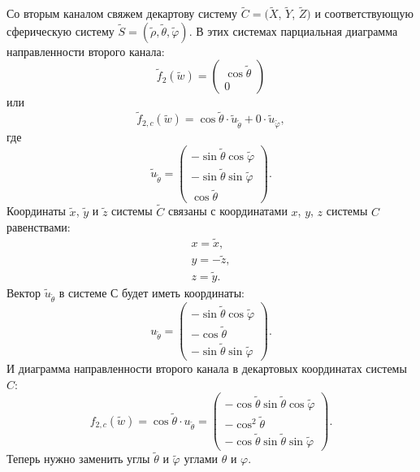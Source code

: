 Со вторым каналом свяжем декартову систему $\widetilde{C} = (\widetilde{X}$, $\widetilde{Y}$, $\widetilde{Z})$ и соответствующую сферическую систему
$\widetilde{S} = (\widetilde{\rho}, \widetilde{\theta}, \widetilde{\varphi})$. В этих системах парциальная диаграмма направленности второго канала:
\[
    \widetilde{f}_2(\widetilde{w}) =
    \begin{pmatrix}
        \cos \widetilde{\theta} \\
        0
    \end{pmatrix}
\]
или
\[
    \widetilde{f}_{2,c}(\widetilde{w}) = \cos \widetilde{\theta} \cdot \widetilde{u}_{\widetilde{\theta}} + 0 \cdot \widetilde{u}_{\widetilde{\varphi}} ,
\]
где
\[
    \widetilde{u}_{\widetilde{\theta}}
    = \begin{pmatrix}
          - \sin \widetilde{\theta} \cos \widetilde{\varphi} \\
          - \sin \widetilde{\theta} \sin \widetilde{\varphi} \\
          \cos \widetilde{\theta}
    \end{pmatrix}.
\]
Координаты $\widetilde{x}$, $\widetilde{y}$ и $\widetilde{z}$ системы $\widetilde{C}$ связаны с координатами $x$, $y$, $z$ системы $C$ равенствами:
\begin{gather*}
    x = \widetilde{x} , \\
    y = - \widetilde{z} , \\
    z = \widetilde{y} .
\end{gather*}
Вектор $\widetilde{u}_{\widetilde{\theta}}$ в системе $С$ будет иметь координаты:
\[
    u_{\widetilde{\theta}}
    = \begin{pmatrix}
          - \sin \widetilde{\theta} \cos \widetilde{\varphi} \\
          - \cos \widetilde{\theta}                          \\
          - \sin \widetilde{\theta} \sin \widetilde{\varphi}
    \end{pmatrix}.
\]
И диаграмма направленности второго канала в декартовых координатах системы $C$:
\[
    f_{2,c}(\widetilde{w})
    = \cos \widetilde{\theta} \cdot u_{\widetilde{\theta}}
    = \begin{pmatrix}
          - \cos \widetilde{\theta} \sin \widetilde{\theta} \cos \widetilde{\varphi} \\
          - \cos^2 \widetilde{\theta}                                                \\
          - \cos \widetilde{\theta} \sin \widetilde{\theta} \sin \widetilde{\varphi}
    \end{pmatrix} .
\]
Теперь нужно заменить углы $\widetilde{\theta}$ и $\widetilde{\varphi}$ углами $\theta$ и $\varphi$.

